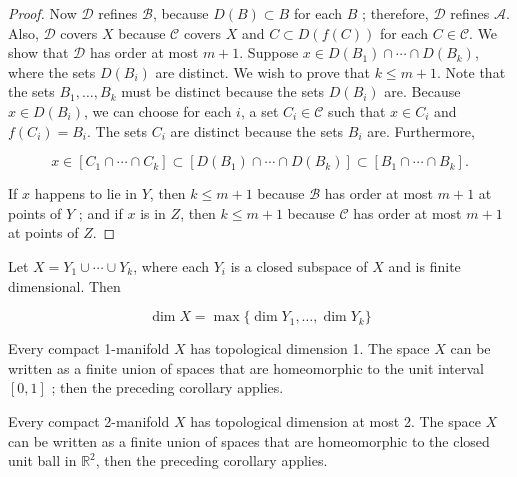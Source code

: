 \begin{proof}
Now \(\mathcal{D}\) refines \(\mathcal{B}\), because \(D( B) \subset B\) for each \(B\) ; therefore, \(\mathcal{D}\) refines \(\mathcal{A}\). Also, \(\mathcal{D}\) covers \(X\) because \(\mathcal{C}\) covers \(X\) and \(C \subset D({f( C) })\) for each \(C \in \mathcal{C}\). We show that \(\mathcal{D}\) has order at most \(m + 1\). Suppose \(x \in D(B_{1}) \cap \cdots \cap D(B_{k})\), where the sets \(D(B_{i})\) are distinct. We wish to prove that \(k \leq m + 1\). Note that the sets \(B_{1},\ldots ,B_{k}\) must be distinct because the sets \(D(B_{i})\) are. Because \(x \in D(B_{i})\), we can choose for each \(i\), a set \(C_{i} \in \mathcal{C}\) such that \(x \in {C}_{i}\) and \(f(C_{i}) = B_{i}\). The sets \(C_{i}\) are distinct because the sets \(B_{i}\) are. Furthermore,

\[
x \in [ {C_{1} \cap \cdots \cap {C}_{k}}] \subset [ {D(B_{1}) \cap \cdots \cap D(B_{k}) }] \subset [ {B_{1} \cap \cdots \cap {B}_{k}}] .
\]

If \(x\) happens to lie in \(Y\), then \(k \leq m + 1\) because \(\mathcal{B}\) has order at most \(m + 1\) at points of \(Y\) ; and if \(x\) is in \(Z\), then \(k \leq m + 1\) because \(\mathcal{C}\) has order at most \(m + 1\) at points of \(Z\).
\end{proof}
\begin{corollary}
\label{cor:\thetheorem}
Let \(X = Y_{1} \cup \cdots \cup {Y}_{k}\), where each \(Y_{i}\) is a closed subspace of \(X\) and is finite dimensional. Then

\[
\dim X = \max \{ {\dim {Y}_{1},\ldots ,\dim {Y}_{k}}\}
\]
\end{corollary}

\begin{centeredblock}
\begin{example}
\label{ex:\thesection.\theexample}
Every compact 1-manifold \(X\) has topological dimension 1. The space \(X\) can be written as a finite union of spaces that are homeomorphic to the unit interval \([0,1]\) ; then the preceding corollary applies.
\end{example}
\end{centeredblock}

\begin{centeredblock}
\begin{example}
\label{ex:\thesection.\theexample}
Every compact 2-manifold \(X\) has topological dimension at most 2. The space \(X\) can be written as a finite union of spaces that are homeomorphic to the closed unit ball in \(\mathbb{R}^{2}\), then the preceding corollary applies.
\end{example}
\end{centeredblock}

